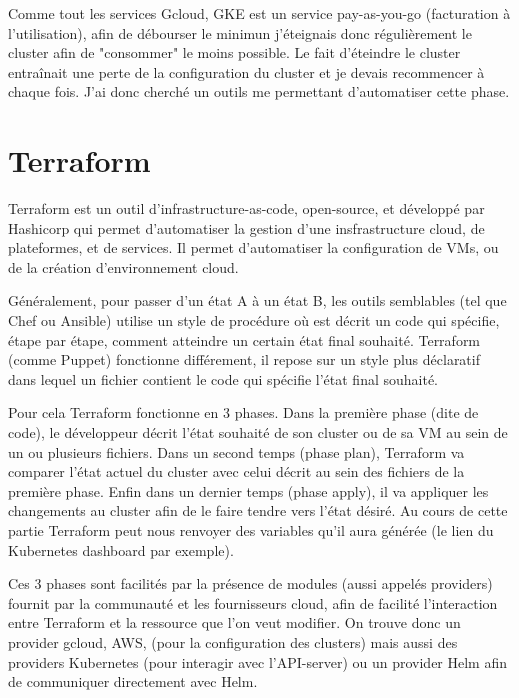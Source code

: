 \documentclass[11pt,fleqn]{book} %
\begin{document}
Comme tout les services Gcloud, GKE est un service pay-as-you-go (facturation à l’utilisation), afin de débourser le minimun j'éteignais donc régulièrement le cluster afin de "consommer" le moins possible. Le fait d'éteindre le cluster entraînait une perte de la configuration du cluster et je devais recommencer à chaque fois. J'ai donc cherché un outils me permettant d'automatiser cette phase.

\section*{Terraform}
Terraform est un outil d'infrastructure-as-code, open-source, et développé par Hashicorp qui permet d'automatiser la gestion d'une insfrastructure cloud, de plateformes, et de services. Il permet d'automatiser la configuration de VMs, ou de la création d'environnement cloud. \newline

Généralement, pour passer d'un état A à un état B, les outils semblables (tel que Chef ou Ansible) utilise un style de procédure où est décrit un code qui spécifie, étape par étape, comment atteindre un certain état final souhaité. Terraform (comme Puppet)  fonctionne différement, il repose sur un style plus déclaratif dans lequel un fichier contient le code qui spécifie l'état final souhaité. \newline

Pour cela Terraform fonctionne en 3 phases. Dans la première phase (dite de code), le développeur décrit l'état souhaité de son cluster ou de sa VM au sein de un ou plusieurs fichiers. Dans un second temps (phase plan), Terraform va comparer l'état actuel du cluster avec celui décrit au sein des fichiers de la première phase. Enfin dans un dernier temps (phase apply), il va appliquer les changements au cluster afin de le faire tendre vers l'état désiré. Au cours de cette partie Terraform peut nous renvoyer des variables qu'il aura générée (le lien du Kubernetes dashboard par exemple).\newline

Ces 3 phases sont facilités par la présence de modules (aussi appelés providers) fournit par la communauté et les fournisseurs cloud, afin de facilité l'interaction entre Terraform et la ressource que l'on veut modifier. On trouve donc un provider gcloud, AWS, (pour la configuration des clusters) mais aussi des providers Kubernetes (pour interagir avec l'API-server) ou un provider Helm afin de communiquer directement avec Helm.\newline
\end{document}
